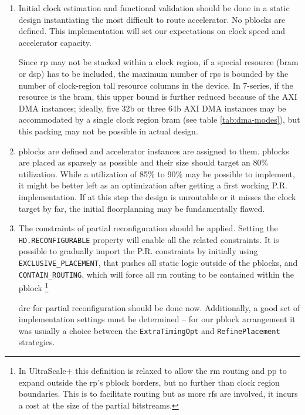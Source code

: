 \begin{enumerate}
\item	Initial clock estimation and functional validation should be done
	in a static design instantiating the most difficult to route accelerator.
	No \glspl{pblock} are defined.
	This implementation will set our expectations on clock speed and
	accelerator capacity.

	Since \gls{rp} may not be stacked within a clock region,
	if a special resource (\gls{bram} or \gls{dsp}) has to be included,
	the maximum number of \glspl{rp} is bounded
	by the number of clock-region tall resource columns in the device.
	In 7-series, if the resource is the \gls{bram}, this upper bound is
	further reduced because of the AXI DMA instances;
	ideally, five 32b or three 64b AXI DMA instances may be accommodated by
	a single clock region \gls{bram} (see table \ref{tab:dma-modes}),
	but this packing may not be possible in actual design.

\item	\Glspl{pblock} are defined and accelerator instances are assigned
	to them. \Glspl{pblock} are placed as sparsely as possible
	and their size should target an 80\% utilization.
	While a utilization of 85\% to 90\% may be possible to implement,
	it might be better left as an optimization after getting
	a first working P.R. implementation. If at this step the
	design is unroutable or it misses the clock target by far,
	the initial floorplanning may be fundamentally flawed.

\item	The constraints of partial reconfiguration should be applied.
	Setting the \texttt{HD.RECONFIGURABLE} property will enable
	all the related constraints.
	It is possible to gradually import the P.R. constraints by
	initially using \texttt{EXCLUSIVE\_PLACEMENT}, that pushes all
	static logic outside of the \glspl{pblock}, and \texttt{CONTAIN\_ROUTING},
	which will force all \gls{rm} routing to be contained within the \gls{pblock}
	\footnote{In UltraScale+ this definition is relaxed to allow the \gls{rm} routing
	and \gls{pp} to expand outside the \gls{rp}'s \gls{pblock} borders, but no further
	than clock region boundaries. This is to facilitate routing but as more \glspl{rf}
	are involved, it incurs a cost at the size of the partial bitstreams.}

	\gls{drc} for partial reconfiguration should be done now.
	Additionally, a good set of implementation settings
	must be determined -- for our \gls{pblock} arrangement it was
	usually a choice between the \texttt{ExtraTimingOpt}
	and \texttt{RefinePlacement} strategies.


\end{enumerate}
